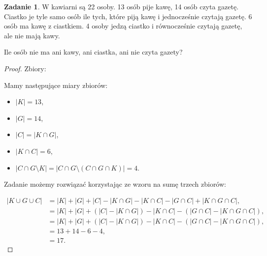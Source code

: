 \documentclass[11pt]{article}
\theoremstyle{definition}
\newtheorem{zadanie}{Zadanie}
\numberwithin{zadanie}{subsection}
\begin{document}
\begin{zadanie}
    W kawiarni są 22 osoby. 13 osób pije kawę, 14 osób czyta gazetę. Ciastko je tyle samo osób ile tych, które piją kawę i jednocześnie czytają gazetę. 6 osób ma kawę z ciastkiem. 4 osoby jedzą ciastko i równocześnie czytają gazetę, ale nie mają kawy.

    Ile osób nie ma ani kawy, ani ciastka, ani nie czyta gazety?
\end{zadanie}
\begin{proof}

    Zbiory:

    \def\A{(0,0) circle (1.5cm)}
    \def\B{(60:2cm) circle (1.5cm)}
    \def\C{(0:2cm) circle (1.5cm)}

    \def\Z{(-2, -2) rectangle (4,4)}




    Mamy następujące miary zbiorów:

    \begin{itemize}
        \item $|K| = 13$,
        \item $|G| = 14$,
        \item $|C| = |K\cap G|$,
        \item $|K\cap C| = 6$,
        \item $|C\cap G \setminus K| = |C\cap G\setminus(C\cap G\cap K)| = 4$.
    \end{itemize}

    Zadanie możemy rozwiązać korzystając ze wzoru na sumę trzech zbiorów:

    \begin{align*}
        |K\cup G\cup C| & = |K| + |G| +|C| - |K\cap G|-|K\cap C|-|G\cap C| + |K\cap G\cap C|,          \\
                        & = |K| + |G| + (|C| - |K\cap G|) - |K\cap C| - (|G\cap C| - |K\cap G\cap C|), \\
                        & = |K| + |G| + (|C| - |K\cap G|) - |K\cap C| - (|G\cap C| - |K\cap G\cap C|), \\
                        & = 13 + 14 - 6 - 4,                                                           \\
                        & = 17.
    \end{align*}
\end{proof}
\end{document}
